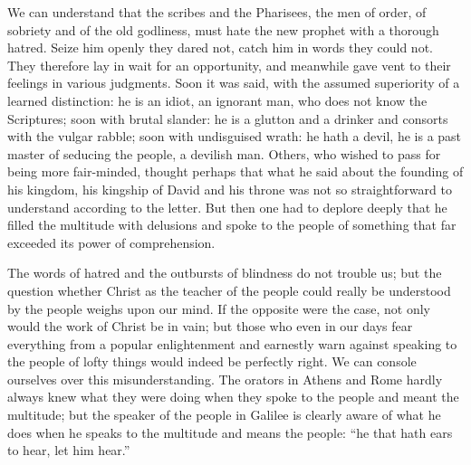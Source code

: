 \documentclass[12pt,a4paper,openany]{book}
\newcommand{\opage}[1]{\marginnote{\footnotesize\textit{[#1]}}}
\begin{document}
We can understand that the scribes and the Pharisees, the men of order, of sobriety and of the old godliness, must hate the new prophet with a thorough hatred. Seize him openly they dared not, catch him in words they could not. They therefore lay in wait for an opportunity, and meanwhile gave vent to their feelings in various judgments. Soon it was said, with the assumed superiority of a learned distinction: he is an idiot, an ignorant man, who
\setcounter{footnote}{0}%
\opage{24}does not know the Scriptures; soon with brutal slander: he is a glutton and a drinker and consorts with the vulgar rabble; soon with undisguised wrath: he hath a devil, he is a past master of seducing the people, a devilish man. Others, who wished to pass for being more fair-minded, thought perhaps that what he said about the founding of his kingdom, his kingship of David and his throne was not so straightforward to understand according to the letter. But then one had to deplore deeply that he filled the multitude with delusions and spoke to the people of something that far exceeded its power of comprehension.

The words of hatred and the outbursts of blindness do not trouble us; but the question whether Christ as the teacher of the people could really be understood by the people weighs upon our mind. If the opposite were the case, not only would the work of Christ be in vain; but those who even in our days fear everything from a popular enlightenment and earnestly warn against speaking to the people of lofty things would indeed be perfectly right. We can console ourselves over this misunderstanding. The orators in Athens and Rome hardly always knew what they were doing when they spoke to the people and meant the multitude; but the speaker of the people in Galilee is clearly aware of what he does when he speaks to the multitude and means the people: ``he that hath ears to hear, let him hear.''
\end{document}
